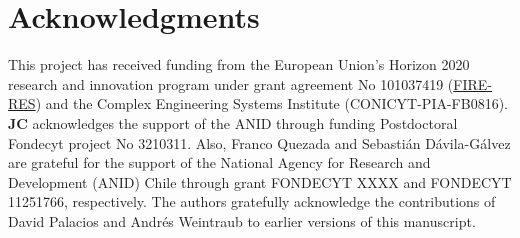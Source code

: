 \documentclass[a4paper,fleqn]{cas-sc}
\begin{document}



\section*{Acknowledgments}
This project has received funding from the European Union’s Horizon 2020 research and innovation program under grant agreement No 101037419 (\href{https://fire-res.eu}{FIRE-RES}) and the Complex Engineering Systems Institute (CONICYT-PIA-FB0816). \textbf{JC} acknowledges the support of the ANID through funding Postdoctoral Fondecyt project No 3210311. Also, Franco Quezada and Sebastián Dávila-Gálvez are grateful for the support of the National Agency for Research and Development (ANID) Chile through grant FONDECYT XXXX and FONDECYT 11251766, respectively. The authors gratefully acknowledge the contributions of David Palacios and Andr\'es Weintraub to earlier versions of this manuscript.








\end{document}
